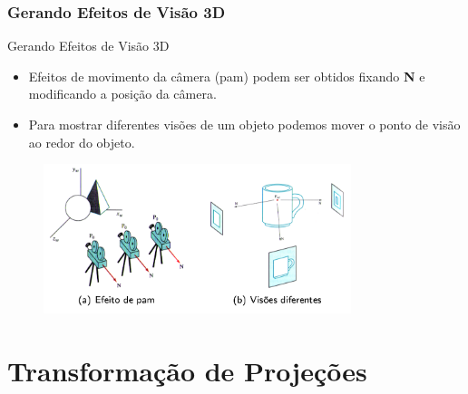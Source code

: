 \documentclass{beamer}
\begin{document}
\begin{frame}
\frametitle{Gerando Efeitos de Visão 3D}
	\begin{block}{Gerando Efeitos de Visão 3D}
		\begin{itemize}
			\item Efeitos de movimento da câmera (pam) podem ser obtidos fixando \textbf{N} e modificando a posição da câmera.
			\item Para mostrar diferentes visões de um objeto podemos mover o ponto de visão ao redor do objeto.
		\end{itemize}
	\end{block}
	
	\begin{figure}[!h]
			\begin{center}
			\includegraphics[width=0.8\textwidth]{Figures/camEfe}
			\end{center}
	\end{figure}
\end{frame}

\section{Transformação de Projeções}
\end{document}
